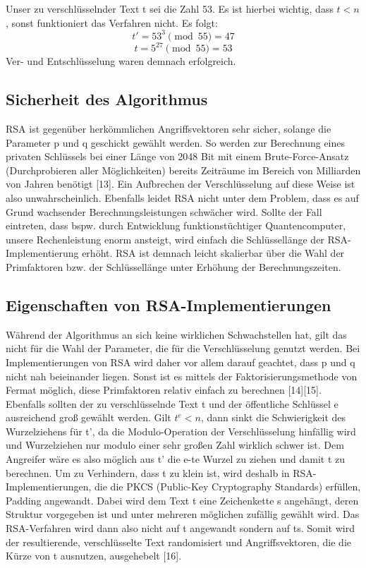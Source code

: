 \documentclass[conference,10pt,a4paper,twocolumn]{IEEEtran}
\begin{document}
Unser zu verschlüsselnder Text t sei die Zahl 53. Es ist hierbei wichtig, dass \begin{math}t < n\end{math}, sonst funktioniert das Verfahren nicht. Es folgt: 
\begin{equation}
t' = 53^3 \pmod{55} = 47
\end{equation}
\begin{equation}
t = 5^{27} \pmod{55} = 53
\end{equation}
Ver- und Entschlüsselung waren demnach erfolgreich.

\subsection{Sicherheit des Algorithmus}
RSA ist gegenüber herkömmlichen Angriffsvektoren sehr sicher, solange die Parameter p und q geschickt gewählt werden. So werden zur Berechnung eines privaten Schlüssels bei einer Länge von 2048 Bit mit einem Brute-Force-Ansatz (Durchprobieren aller Möglichkeiten) bereits Zeiträume im Bereich von Milliarden von Jahren benötigt [13]. Ein Aufbrechen der Verschlüsselung auf diese Weise ist also unwahrscheinlich. Ebenfalls leidet RSA nicht unter dem Problem, dass es auf Grund wachsender Berechnungsleistungen schwächer wird. Sollte der Fall eintreten, dass bspw. durch Entwicklung funktionstüchtiger Quantencomputer, unsere Rechenleistung enorm ansteigt, wird einfach die Schlüssellänge der RSA-Implementierung erhöht. RSA ist demnach leicht skalierbar über die Wahl der Primfaktoren bzw. der Schlüssellänge unter Erhöhung der Berechnungszeiten.

\subsection{Eigenschaften von RSA-Implementierungen}
Während der Algorithmus an sich keine wirklichen Schwachstellen hat, gilt das nicht für die Wahl der Parameter, die für die Verschlüsselung genutzt werden. Bei Implementierungen von RSA wird daher vor allem darauf geachtet, dass p und q nicht nah beieinander liegen. Sonst ist es mittels der Faktorisierungsmethode von Fermat möglich, diese Primfaktoren relativ einfach zu berechnen [14][15]. Ebenfalls sollten der zu verschlüsselnde Text t und der öffentliche Schlüssel e ausreichend groß gewählt werden. Gilt \begin{math}t^e < n\end{math}, dann sinkt die Schwierigkeit des Wurzelziehens für t', da die Modulo-Operation der Verschlüsselung hinfällig wird und Wurzelziehen nur modulo einer sehr großen Zahl wirklich schwer ist. Dem Angreifer wäre es also möglich aus t' die e-te Wurzel zu ziehen und damit t zu berechnen.
Um zu Verhindern, dass t zu klein ist, wird deshalb in RSA-Implementierungen, die die PKCS (Public-Key Cryptography Standards) erfüllen, Padding angewandt. Dabei wird dem Text t eine Zeichenkette s angehängt, deren Struktur vorgegeben ist und unter mehreren möglichen zufällig gewählt wird. Das RSA-Verfahren wird dann also nicht auf t angewandt sondern auf ts. Somit wird der resultierende, verschlüsselte Text randomisiert und Angriffsvektoren, die die Kürze von t ausnutzen, ausgehebelt [16].
\end{document}
